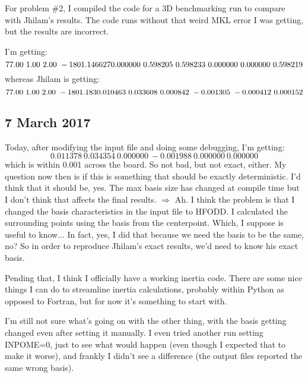 \documentclass[]{report}
\begin{document}
For problem \#2, I compiled the code for a 3D benchmarking run to compare with Jhilam's results. The code runs without that weird MKL error I was getting, but the results are incorrect.

I'm getting:
\begin{equation}
   77.00\    1.00\    2.00\   -1801.146627 \\
       0.000000\    0.598205\    0.598233\    0.000000\    0.000000\    0.598219
\end{equation}
whereas Jhilam is getting:
\begin{equation}
   77.00\    1.00\    2.00\   -1801.183 \\
   0.010463\    0.033608\    0.000842\   -0.001305\   -0.000412\    0.000152
\end{equation}

\subsection*{7 March 2017}
Today, after modifying the input file and doing some debugging, I'm getting:
\begin{equation}
    0.011378\    0.034354\    0.000000\   -0.001988\    0.000000\    0.000000
\end{equation}
\noindent which is within 0.001 across the board. So not bad, but not exact, either. My question now then is if this is something that should be exactly deterministic. I'd think that it should be, yes. The max basis size has changed at compile time but I don't think that affects the final results. $\Rightarrow$ Ah. I think the problem is that I changed the basis characteristics in the input file to HFODD. I calculated the surrounding points using the basis from the centerpoint. Which, I suppose is useful to know... In fact, yes, I did that because we need the basis to be the same, no? So in order to reproduce Jhilam's exact results, we'd need to know his exact basis.

Pending that, I think I officially have a working inertia code. There are some nice things I can do to streamline inertia calculations, probably within Python as opposed to Fortran, but for now it's something to start with.

I'm still not sure what's going on with the other thing, with the basis getting changed even after setting it manually. I even tried another run setting INPOME=0, just to see what would happen (even though I expected that to make it worse), and frankly I didn't see a difference (the output files reported the same wrong basis).
\end{document}
